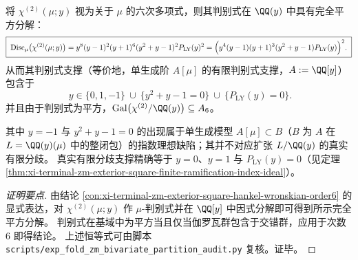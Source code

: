 \begin{conclusion}[外二次判别式的完全平方分解与二阶共振临界集]\label{con:xi-terminal-zm-exterior-square-discriminant-square}
将 \(\chi^{(2)}(\mu;y)\) 视为关于 \(\mu\) 的六次多项式，则其判别式在 \(\QQ(y)\) 中具有完全平方分解：
\[
\boxed{\;
\mathrm{Disc}_{\mu}\bigl(\chi^{(2)}(\mu;y)\bigr)
=y^8(y-1)^2(y+1)^6(y^2+y-1)^2P_{\mathrm{LY}}(y)^2
=\Bigl(y^4(y-1)(y+1)^3(y^2+y-1)P_{\mathrm{LY}}(y)\Bigr)^2.
\;}
\]
从而其判别式支撑（等价地，单生成阶 \(A[\mu]\) 的有限判别式支撑，\(A:=\QQ[y]\)）包含于
\[
\boxed{\;y\in\{0,1,-1\}\ \cup\ \{y^2+y-1=0\}\ \cup\ \{P_{\mathrm{LY}}(y)=0\}.}
\]
并且由于判别式为平方，\(\mathrm{Gal}\bigl(\chi^{(2)}/\QQ(y)\bigr)\subseteq A_6\)。
\par
其中 \(y=-1\) 与 \(y^2+y-1=0\) 的出现属于单生成模型 \(A[\mu]\subset B\)（\(B\) 为 \(A\) 在 \(L=\QQ(y)(\mu)\) 中的整闭包）的指数理想缺陷；其并不对应扩张 \(L/\QQ(y)\) 的真实有限分歧。
真实有限分歧支撑精确等于 \(y=0\)、\(y=1\) 与 \(P_{\mathrm{LY}}(y)=0\)（见定理 \ref{thm:xi-terminal-zm-exterior-square-finite-ramification-index-ideal}）。
\end{conclusion}
\begin{proof}[证明要点]
由结论 \ref{con:xi-terminal-zm-exterior-square-hankel-wronskian-order6} 的显式表达，对 \(\chi^{(2)}(\mu;y)\) 作 \(\mu\)-判别式并在 \(\QQ[y]\) 中因式分解即可得到所示完全平方分解。
判别式在基域中为平方当且仅当伽罗瓦群包含于交错群，应用于次数 \(6\) 即得结论。
上述恒等式可由脚本 \texttt{scripts/exp\_fold\_zm\_bivariate\_partition\_audit.py} 复核。证毕。
\end{proof}

